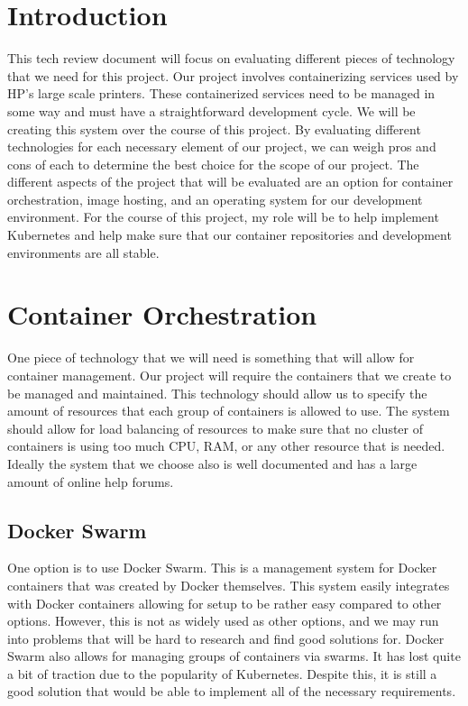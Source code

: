 \documentclass[onecolumn, draftclsnofoot,10pt, compsoc]{IEEEtran}
\begin{document}


\section{Introduction}

This tech review document will focus on evaluating different pieces of technology that we need for this project. Our project involves containerizing services used by HP's large scale printers. These containerized services need to be managed in some way and must have a straightforward development cycle. We will be creating this system over the course of this project. By evaluating different technologies for each necessary element of our project, we can weigh pros and cons of each to determine the best choice for the scope of our project. The different aspects of the project that will be evaluated are an option for container orchestration, image hosting, and an operating system for our development environment. For the course of this project, my role will be to help implement Kubernetes and help make sure that our container repositories and development environments are all stable.

\section{Container Orchestration}

One piece of technology that we will need is something that will allow for container management. Our project will require the containers that we create to be managed and maintained. This technology should allow us to specify the amount of resources that each group of containers is allowed to use. The system should allow for load balancing of resources to make sure that no cluster of containers is using too much CPU, RAM, or any other resource that is needed. Ideally the system that we choose also is well documented and has a large amount of online help forums. 

\subsection{Docker Swarm}
One option is to use Docker Swarm. This is a management system for Docker containers that was created by Docker themselves. This system easily integrates with Docker containers allowing for setup to be rather easy compared to other options. However, this is not as widely used as other options, and we may run into problems that will be hard to research and find good solutions for. Docker Swarm also allows for managing groups of containers via swarms.\cite{d_swarm} It has lost quite a bit of traction due to the popularity of Kubernetes. Despite this, it is still a good solution that would be able to implement all of the necessary requirements. \cite{kub}
\end{document}
